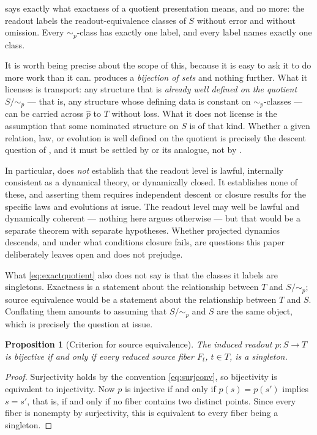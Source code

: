 \documentclass[11pt,reqno]{amsart}
\theoremstyle{plain}
\newtheorem{proposition}[theorem]{Proposition}
\theoremstyle{definition}
\theoremstyle{remark}
\begin{document}
 says exactly what exactness of a quotient presentation means, and no more: the readout labels the readout-equivalence classes of $S$ without error and without omission. Every $\sim_{p}$-class has exactly one label, and every label names exactly one class.

It is worth being precise about the scope of this, because it is easy to ask it to do more work than it can.  produces a \emph{bijection of sets} and nothing further. What it licenses is transport: any structure that is \emph{already well defined on the quotient} $S/\!\sim_{p}$ --- that is, any structure whose defining data is constant on $\sim_{p}$-classes --- can be carried across $\widehat p$ to $T$ without loss. What it does not license is the assumption that some nominated structure on $S$ is of that kind. Whether a given relation, law, or evolution is well defined on the quotient is precisely the descent question of , and it must be settled by  or its analogue, not by .

In particular,  does \emph{not} establish that the readout level is lawful, internally consistent as a dynamical theory, or dynamically closed. It establishes none of these, and asserting them requires independent descent or closure results for the specific laws and evolutions at issue. The readout level may well be lawful and dynamically coherent --- nothing here argues otherwise --- but that would be a separate theorem with separate hypotheses. Whether projected dynamics descends, and under what conditions closure fails, are questions this paper deliberately leaves open and does not prejudge.

What \eqref{eq:exactquotient} also does not say is that the classes it labels are singletons. Exactness is a statement about the relationship between $T$ and $S/\!\sim_{p}$; source equivalence would be a statement about the relationship between $T$ and $S$. Conflating them amounts to assuming that $S/\!\sim_{p}$ and $S$ are the same object, which is precisely the question at issue.

\begin{proposition}[Criterion for source equivalence]
\label{prop:sourceeq}
The induced readout $p\colon S\to T$ is bijective if and only if every reduced source fiber $F_{t}$, $t\in T$, is a singleton.
\end{proposition}

\begin{proof}
Surjectivity holds by the convention \eqref{eq:surjconv}, so bijectivity is equivalent to injectivity. Now $p$ is injective if and only if $p(s)=p(s')$ implies $s=s'$, that is, if and only if no fiber contains two distinct points. Since every fiber is nonempty by surjectivity, this is equivalent to every fiber being a singleton.
\end{proof}
\end{document}
